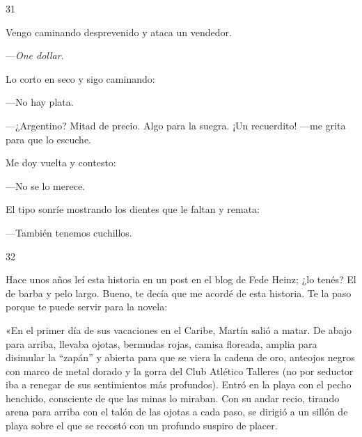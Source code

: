 \documentclass[12pt,twoside,openright,a5paper]{book}
\begin{document}
\vspace{0.5cm}

\hrulefill \hspace{0.1cm}\decofourleft\hspace{0.2cm} 31 \hspace{0.2cm}\decofourright \hspace{0.1cm}\hrulefill

\nopagebreak

\vspace{0.5cm}

\nopagebreak

Vengo caminando desprevenido y ataca un vendedor.

---\emph{One dollar}.

Lo corto en seco y sigo caminando:

---No hay plata.

---¿Argentino? Mitad de precio. Algo para la suegra. ¡Un recuerdito! ---me grita
para que lo escuche.

Me doy vuelta y contesto:

---No se lo merece.

El tipo sonríe mostrando los dientes que le faltan y remata: 

---También tenemos cuchillos.

\vspace{0.5cm}

\hrulefill \hspace{0.1cm}\decofourleft\hspace{0.2cm} 32 \hspace{0.2cm}\decofourright \hspace{0.1cm}\hrulefill

\nopagebreak

\vspace{0.5cm}

\nopagebreak

Hace unos años leí esta historia en un post en el blog de Fede Heinz;
¿lo tenés? El de barba y pelo largo. Bueno, te decía que me acordé de
esta historia. Te la paso porque te puede servir para la novela:

«En el primer día de sus vacaciones en el Caribe, Martín salió a matar. De
abajo para arriba, llevaba ojotas, bermudas rojas, camisa floreada, amplia
para disimular la ``zapán'' y abierta para que se viera la cadena de oro,
anteojos negros con marco de metal dorado y la gorra del Club Atlético
Talleres (no por seductor iba a renegar de sus sentimientos más
profundos). Entró en la playa con el pecho henchido, consciente de que las
minas lo miraban. Con su andar recio, tirando arena para arriba con el
talón de las ojotas a cada paso, se dirigió a un sillón de playa sobre
el que se recostó con un profundo suspiro de placer.
\end{document}
